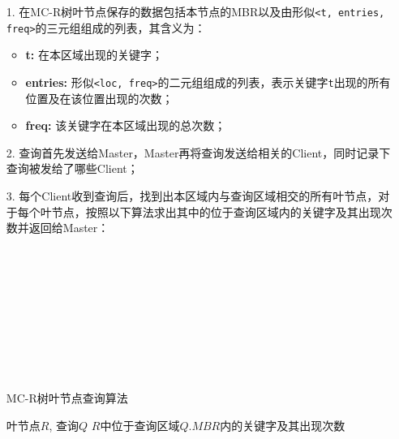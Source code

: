 \documentclass{elegantpaper}
\begin{document}
\begin{itemize}
    
    \item[1.] 在MC-R树叶节点保存的数据包括本节点的MBR以及由形似\verb|<t, entries, freq>|的三元组组成的列表，其含义为：
              
              \begin{itemize}
                  
                \item {\bfseries t:} 在本区域出现的关键字；
                
                \item {\bfseries entries:} 形似\verb|<loc, freq>|的二元组组成的列表，表示关键字\verb|t|出现的所有位置及在该位置出现的次数；
                
                \item {\bfseries freq:} 该关键字在本区域出现的总次数；

              \end{itemize}

    \item[2.] 查询首先发送给Master，Master再将查询发送给相关的Client，同时记录下查询被发给了哪些Client；
    
    \item[3.] 每个Client收到查询后，找到出本区域内与查询区域相交的所有叶节点，对于每个叶节点，按照以下算法求出其中的位于查询区域内的关键字及其出现次数并返回给Master：\\\\\\\\\\\\\\\\\\\\
    
              \begin{algorithm}

                \begin{algorithmic}[1]
                    \caption{MC-R树叶节点查询算法}
                    \Require 叶节点$R$, 查询$Q$
                    \Ensure $R$中位于查询区域$Q.MBR$内的关键字及其出现次数


\end{algorithmic}
\end{algorithm}
\end{itemize}
\end{document}
